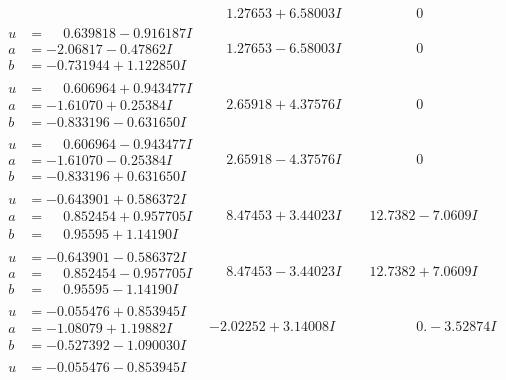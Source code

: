 \documentclass[1p]{elsarticle_modified}
\theoremstyle{definition}
\begin{document}
$$\begin{array}{c|c|c}
 & \phantom{-}1.27653 + 6.58003 I & \phantom{-0.000000 } 0 \\ \hline\begin{aligned}
u &= \phantom{-}0.639818 - 0.916187 I \\
a &= -2.06817 - 0.47862 I \\
b &= -0.731944 + 1.122850 I\end{aligned}
 & \phantom{-}1.27653 - 6.58003 I & \phantom{-0.000000 } 0 \\ \hline\begin{aligned}
u &= \phantom{-}0.606964 + 0.943477 I \\
a &= -1.61070 + 0.25384 I \\
b &= -0.833196 - 0.631650 I\end{aligned}
 & \phantom{-}2.65918 + 4.37576 I & \phantom{-0.000000 } 0 \\ \hline\begin{aligned}
u &= \phantom{-}0.606964 - 0.943477 I \\
a &= -1.61070 - 0.25384 I \\
b &= -0.833196 + 0.631650 I\end{aligned}
 & \phantom{-}2.65918 - 4.37576 I & \phantom{-0.000000 } 0 \\ \hline\begin{aligned}
u &= -0.643901 + 0.586372 I \\
a &= \phantom{-}0.852454 + 0.957705 I \\
b &= \phantom{-}0.95595 + 1.14190 I\end{aligned}
 & \phantom{-}8.47453 + 3.44023 I & \phantom{-}12.7382 - 7.0609 I \\ \hline\begin{aligned}
u &= -0.643901 - 0.586372 I \\
a &= \phantom{-}0.852454 - 0.957705 I \\
b &= \phantom{-}0.95595 - 1.14190 I\end{aligned}
 & \phantom{-}8.47453 - 3.44023 I & \phantom{-}12.7382 + 7.0609 I \\ \hline\begin{aligned}
u &= -0.055476 + 0.853945 I \\
a &= -1.08079 + 1.19882 I \\
b &= -0.527392 - 1.090030 I\end{aligned}
 & -2.02252 + 3.14008 I & \phantom{-0.000000 } 0. - 3.52874 I \\ \hline\begin{aligned}
u &= -0.055476 - 0.853945 I \\

\end{aligned}
\end{array}$$
\end{document}
